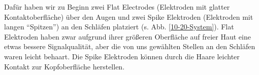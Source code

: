 \documentclass[11pt]{scrartcl}
\begin{document}
	\begin{figure}[h!]
	\end{figure}

	Dafür haben wir zu Beginn zwei Flat Electrodes (Elektroden mit glatter Kontaktoberfläche) über den Augen und zwei Spike Elektroden (Elektroden mit langen \enquote{Spitzen}) an den Schläfen platziert (s. Abb. \ref{10-20-System}). Flat Elektroden haben zwar aufgrund ihrer größeren Oberfläche auf freier Haut eine etwas bessere Signalqualität, aber die von uns gewählten Stellen an den Schläfen waren leicht behaart. Die Spike Elektroden können durch die Haare leichter Kontakt zur Kopfoberfläche herstellen.

	\begin{figure}[h!]
	\end{figure}
\end{document}
